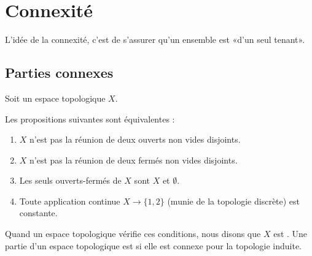 
\section{Connexité}

L'idée de la connexité, c'est de s'assurer qu'un ensemble est «d'un seul tenant».

\subsection{Parties connexes}


\begin{propositionDef}	\label{PROPooNLXDooVTZLan}
	Soit un espace topologique \( X\).
	\begin{subproof}
		\spitem[Connexité de \( X\)]
		Les propositions suivantes sont équivalentes :
		\begin{enumerate}
			\item
			      \( X\) n'est pas la réunion de deux ouverts non vides disjoints.
			\item
			      \( X\) n'est pas la réunion de deux fermés non vides disjoints.
			\item
			      Les seuls ouverts-fermés de \( X\) sont \( X\) et \( \emptyset\).
			\item
			      Toute application continue \( X\to\{ 1,2 \}\) (munie de la topologie discrète) est constante.
		\end{enumerate}
		Quand un espace topologique vérifie ces conditions, nous disons que \( X\) est .
				\label{SPITEMooZSALooTrWMRW}
		Une partie d'un espace topologique est  si elle est connexe pour la topologie induite.
	\end{subproof}
\end{propositionDef}

